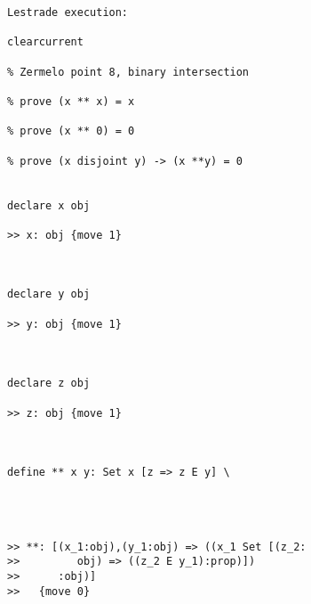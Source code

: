 \documentclass[12pt]{article}
\begin{document}
\begin{verbatim}Lestrade execution:

clearcurrent

% Zermelo point 8, binary intersection

% prove (x ** x) = x

% prove (x ** 0) = 0

% prove (x disjoint y) -> (x **y) = 0


declare x obj

>> x: obj {move 1}



declare y obj

>> y: obj {move 1}



declare z obj

>> z: obj {move 1}



define ** x y: Set x [z => z E y] \
   



>> **: [(x_1:obj),(y_1:obj) => ((x_1 Set [(z_2:
>>         obj) => ((z_2 E y_1):prop)])
>>      :obj)]
>>   {move 0}


\end{verbatim}
\end{document}
